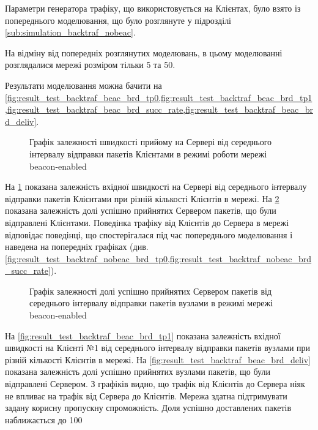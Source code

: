 \documentclass[a4paper,ukrainian,utf8,nocolumnsxix,nocolumnxxxii,nocolumnxxxi,floatsection,equationsection]{eskdtext}
\newcommand{\longcaption}[1]{\captionsetup{style=figureLongCaption}\caption{#1}}
\newcommand{\bem}[0]{beacon-enabled\xspace}
\begin{document}
Параметри генератора трафіку, що використовується на Клієнтах, було взято із попереднього моделювання, що було розглянуте у підрозділі \ref{sub:simulation_backtraf_nobeac}.

На відміну від попередніх розглянутих моделювань, в цьому моделюванні розглядалися мережі розміром тільки 5 та 50. %

Результати моделювання можна бачити на \cref{fig:result_test_backtraf_beac_brd_tp0,fig:result_test_backtraf_beac_brd_tp1,fig:result_test_backtraf_beac_brd_succ_rate,fig:result_test_backtraf_beac_brd_deliv}.

\begin{figure}[hbp]
	\centering
	\longcaption{\label{fig:result_test_backtraf_beac_brd_tp0}Графік залежності швидкості прийому на Сервері від середнього інтервалу відправки пакетів Клієнтами в режимі роботи мережі \bem}
\end{figure}

На \cref{fig:result_test_backtraf_beac_brd_tp0} показана залежність вхідної швидкості на Сервері від середнього інтервалу відправки пакетів Клієнтами при різній кількості Клієнтів в мережі. На \cref{fig:result_test_backtraf_beac_brd_succ_rate} показана залежність долі успішно прийнятих Сервером пакетів, що були відправлені Клієнтами. Поведінка трафіку від Клієнтів до Сервера в мережі відповідає поведінці, що спостерігалася під час попереднього моделювання і наведена на попередніх графіках (див.  \cref{fig:result_test_backtraf_nobeac_brd_tp0,fig:result_test_backtraf_nobeac_brd_succ_rate}). 

\begin{figure}[hbp]
	\centering
	\caption{\label{fig:result_test_backtraf_beac_brd_succ_rate}Графік залежності долі успішно прийнятих Сервером пакетів від середнього інтервалу відправки пакетів вузлами в режимі мережі \bem}
\end{figure}


На \cref{fig:result_test_backtraf_beac_brd_tp1} показана залежність вхідної швидкості на Клієнті №1 від середнього інтервалу відправки пакетів вузлами при різній кількості Клієнтів в мережі. На \cref{fig:result_test_backtraf_beac_brd_deliv} показана залежність долі успішно прийнятих вузлами пакетів, що були відправлені Сервером. З графіків видно, що трафік від Клієнтів до Сервера ніяк не впливає на трафік від Сервера до Клієнтів. Мережа здатна підтримувати задану корисну пропускну спроможність. Доля успішно доставлених пакетів наближається до 100%
\end{document}
